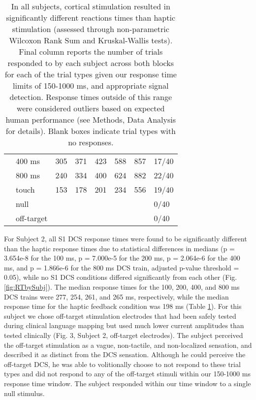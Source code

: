 \begin{table}[ht]
\begin{tabularx}{\textwidth}{@{}lXXXXXXX@{}}
		& 400 ms & 305 & 371 & 423 & 588 & 857 & 17/40 \\
		& 800 ms & 240 & 334 & 400 & 624 & 882 & 22/40 \\
		& touch & 153 & 178 & 201 & 234 & 556 & 19/40 \\
		& null & & & & & &  0/40 \\
		& off-target & & & & & &  0/40 \\
				\bottomrule
	\end{tabularx}
	\caption[Reaction times for each subject and each condition]{In all subjects, cortical stimulation resulted in significantly different reactions times than haptic stimulation (assessed through non-parametric Wilcoxon Rank Sum and Kruskal-Wallis tests). Final column reports the number of trials responded to by each subject across both blocks for each of the trial types given our response time limits of 150-1000 ms, and appropriate signal detection. Response times outside of this range were considered outliers based on expected human performance (see Methods, Data Analysis for details). Blank boxes indicate trial types with no responses.}
	\label{table:responseTimes}
\end{table}

For Subject 2, all S1 DCS response times were found to be significantly different than the haptic response times due to statistical differences in medians (p = 3.654e-8 for the 100 ms, p = 7.000e-5 for the 200 ms, p = 2.064e-6 for the 400 ms, and p = 1.866e-6 for the 800 ms DCS train, adjusted p-value threshold = 0.05), while no S1 DCS conditions differed significantly from each other (Fig. \ref{fig:RTbySubj}). The median response times for the 100, 200, 400, and 800 ms DCS trains were 277, 254, 261, and 265 ms, respectively, while the median response time for the haptic feedback condition was 198 ms (Table \ref{table:responseTimes}). For this subject we chose off-target stimulation electrodes that had been safely tested during clinical language mapping but used much lower current amplitudes than tested clinically (Fig. 3, Subject 2, off-target electrodes). The subject perceived the off-target stimulation as a vague, non-tactile, and non-localized sensation, and described it as distinct from the DCS sensation. Although he could perceive the off-target DCS, he was able to volitionally choose to not respond to these trial types and did not respond to any of the off-target stimuli within our 150-1000 ms response time window. The subject responded within our time window to a single null stimulus.

